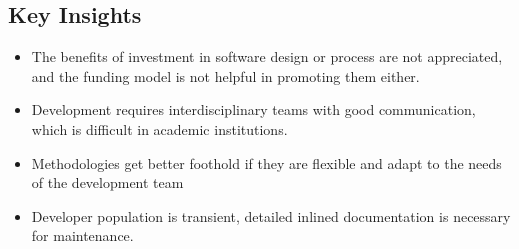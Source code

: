 \subsection*{Key Insights}
\label{institutional-insights}
\begin{itemize}
\item The benefits of investment in software design or process are not
appreciated, and the funding model is not helpful in promoting them either. 
\item Development requires interdisciplinary teams with good
communication, which is difficult in academic institutions. 
\item Methodologies get better foothold if they are flexible and adapt
to the needs of the development team
\item Developer population is transient, detailed inlined documentation is
necessary for maintenance.
\end{itemize}